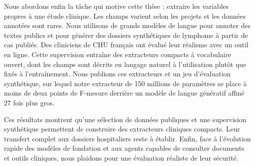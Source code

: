Nous abordons enfin la tâche qui motive cette thèse : extraire les variables propres à une étude clinique. Les champs varient selon les projets et les données annotées sont rares. Nous utilisons de grands modèles de langue pour annoter des textes publics et pour générer des dossiers synthétiques de lymphome à partir de cas publiés. Des cliniciens de CHU français ont évalué leur réalisme avec un outil en ligne. Cette supervision entraîne des extracteurs compacts à vocabulaire ouvert, dont les champs sont décrits en langage naturel à l'utilisation plutôt que fixés à l'entraînement. Nous publions ces extracteurs et un jeu d'évaluation synthétique, sur lequel notre extracteur de 150 millions de paramètres se place à moins de deux points de F-mesure derrière un modèle de langue génératif affiné 27 fois plus gros.

Ces résultats montrent qu'une sélection de données publiques et une supervision synthétique permettent de construire des extracteurs cliniques compacts. Leur transfert complet aux dossiers hospitaliers reste à établir. Enfin, face à l'évolution rapide des modèles de fondation et aux agents capables de consulter documents et outils cliniques, nous plaidons pour une évaluation réaliste de leur sécurité.
